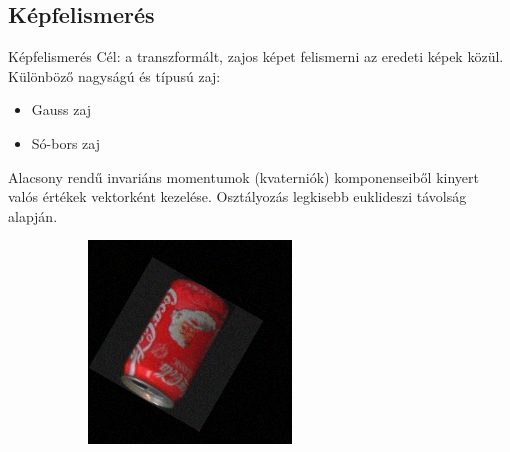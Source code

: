 \documentclass{beamer}
\begin{document}
\subsection{Képfelismerés}
\begin{frame}{Képfelismerés}
    \vskip 12mm
Cél: a transzformált, zajos képet felismerni az eredeti képek közül.\\
Különböző nagyságú és típusú zaj:
\begin{itemize}
    \item Gauss zaj
    \item Só-bors zaj
\end{itemize}
Alacsony rendű invariáns momentumok (kvaterniók) komponenseiből kinyert valós értékek vektorként kezelése. Osztályozás legkisebb euklideszi távolság alapján.
\begin{figure}[tbp]
    \begin{subfigure}{0.25\textwidth}
        \centering
    \includegraphics[width=\textwidth]{figures/noise/gauss5.png}
    \end{subfigure}
    \begin{subfigure}{0.25\textwidth}
        \centering

\end{subfigure}
\end{figure}
\end{frame}
\end{document}

